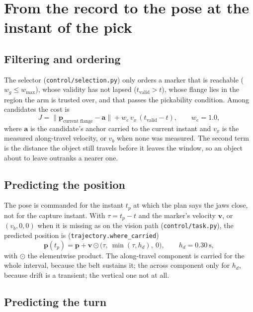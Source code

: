 \documentclass[11pt,a4paper]{article}
\theoremstyle{definition}
\theoremstyle{remark}
\newcommand{\code}[1]{\texttt{#1}}
\begin{document}
\section{From the record to the pose at the instant of the pick}
\label{sec:instant}

\subsection{Filtering and ordering}

The selector (\code{control/selection.py}) only orders a marker that is
reachable ($w_g \le w_{\max}$), whose validity has not lapsed
($t_{\text{valid}} > t$), whose flange lies in the region the arm is trusted
over, and that passes the pickability condition. Among candidates the cost is
\begin{equation}
J = \bigl\|\mathbf p_{\text{current flange}} - \mathbf a\bigr\| + w_e\,v_x\,(t_{\text{valid}} - t),
\qquad w_e = 1.0,
\end{equation}
where $\mathbf a$ is the candidate's anchor carried to the current instant and
$v_x$ is the measured along-travel velocity, or $v_b$ when none was measured. The
second term is the distance the object still travels before it leaves the
window, so an object about to leave outranks a nearer one.

\subsection{Predicting the position}

The pose is commanded for the instant $t_p$ at which the plan says the jaws
close, not for the capture instant. With $\tau = t_p - t$ and the marker's
velocity $\mathbf v$, or $(v_b, 0, 0)$ when it is missing as on the vision path
(\code{control/task.py}), the predicted position is
(\code{trajectory.where\_carried})
\begin{equation}
\label{eq:where-carried}
\mathbf p(t_p) = \mathbf p + \mathbf v \odot \bigl(\tau,\ \min(\tau, h_d),\ 0\bigr),
\qquad h_d = 0.30\ \text{s},
\end{equation}
with $\odot$ the elementwise product. The along-travel component is carried for
the whole interval, because the belt sustains it; the across component only for
$h_d$, because drift is a transient; the vertical one not at all.

\subsection{Predicting the turn}
\end{document}
